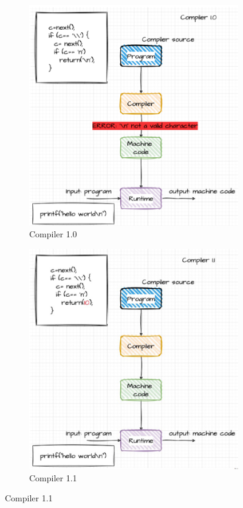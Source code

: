 \begin{figure}[h]
    \centering
    \begin{subfigure}[b]{0.4\textwidth}
        \centering
        \includegraphics[width=\textwidth]{Figures/Compiler0.png}
        \caption{Compiler 1.0}
        \label{Compiler 1.0}
    \end{subfigure}
    \hfill
    \begin{subfigure}[b]{0.4\textwidth}
        \centering
        \includegraphics[width=\textwidth]{Figures/Compiler1.png}
        \caption{Compiler 1.1}
        \label{Compiler 1.1}
    \end{subfigure}
\end{figure}

